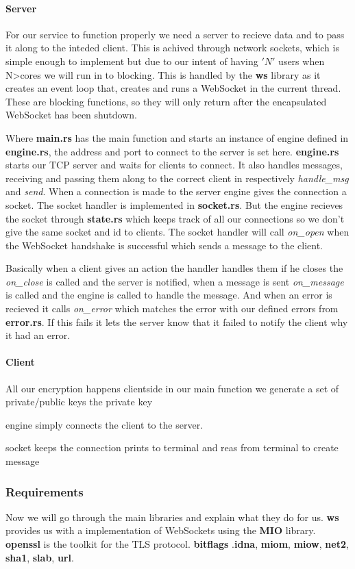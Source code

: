 \paragraph{Server}

For our service to function properly we need a server to recieve data
and to pass it along to the inteded client. This is achived through
network sockets, which is simple enough to implement but due to our
intent of having $'N'$ users when N>cores we will run in to blocking.
This is handled by the \textbf{ws} library as it creates an event loop
that, creates and runs a WebSocket in the current thread. These are
blocking functions, so they will only return after the encapsulated
WebSocket has been shutdown.

Where \textbf{main.rs} has the main function and starts an instance of
engine defined in \textbf{engine.rs}, the address and port to connect
to the server is set here. \textbf{engine.rs} starts our TCP server
and waits for clients to connect. It also handles messages, receiving
and passing them along to the correct client in respectively
\emph{handle\_msg} and \emph{send}. When a connection is made to the
server engine gives the connection a socket. The socket handler is
implemented in \textbf{socket.rs}. But the engine recieves the socket
through \textbf{state.rs} which keeps track of all our connections so
we don't give the same socket and id to clients. The socket handler
will call \emph{on\_open} when the WebSocket handshake is successful
which sends a message to the client.

Basically when a client gives an action the handler handles them if he
closes the \emph{on\_close} is called and the server is notified, when
a message is sent \emph{on\_message} is called and the engine is
called to handle the message. And when an error is recieved it calls
\emph{on\_error} which matches the error with our defined errors from
\textbf{error.rs}. If this fails it lets the server know that it
failed to notify the client why it had an error.

\paragraph{Client}
All our encryption happens clientside in our main function we generate a set of private/public keys the private key


engine simply connects the client to the server.

socket keeps the connection prints to terminal and reas from terminal to create message






\subsubsection{Requirements}
Now we will go through the main libraries and explain what they do for
us. \textbf{ws} provides us with a implementation of WebSockets using
the \textbf{MIO} library. \textbf{openssl} is the toolkit for the TLS
protocol.  \textbf{bitflags} .\textbf{idna}, \textbf{miom},
\textbf{miow}, \textbf{net2}, \textbf{sha1}, \textbf{slab}, \textbf{url}.
